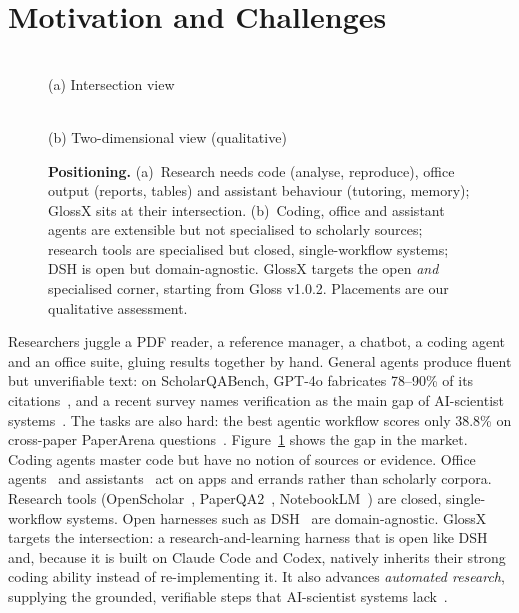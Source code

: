 \documentclass{article}
\newcommand{\sysname}{GlossX}
\begin{document}
\section{Motivation and Challenges}
\label{sec:motivation}

\begin{figure}[t]
  \centering
  \begin{minipage}[b]{0.44\textwidth}
    \centering
    \resizebox{\linewidth}{!}{}\\[-2pt]
    {\small (a) Intersection view}
  \end{minipage}\hfill
  \begin{minipage}[b]{0.53\textwidth}
    \centering
    \resizebox{\linewidth}{!}{}\\[-2pt]
    {\small (b) Two-dimensional view (qualitative)}
  \end{minipage}
  \caption{\textbf{Positioning.} (a)~Research needs code (analyse, reproduce), office output (reports, tables) and assistant behaviour (tutoring, memory); \sysname{} sits at their intersection. (b)~Coding, office and assistant agents are extensible but not specialised to scholarly sources; research tools are specialised but closed, single-workflow systems; DSH is open but domain-agnostic. \sysname{} targets the open \emph{and} specialised corner, starting from Gloss v1.0.2. Placements are our qualitative assessment.}
  \label{fig:positioning}
  \vspace{-8pt}
\end{figure}

Researchers juggle a PDF reader, a reference manager, a chatbot, a coding agent and an office suite, gluing results together by hand. General agents produce fluent but unverifiable text: on ScholarQABench, GPT-4o fabricates 78--90\% of its citations~\cite{asai2024openscholar}, and a recent survey names verification as the main gap of AI-scientist systems~\cite{ding2026verification}. The tasks are also hard: the best agentic workflow scores only 38.8\% on cross-paper PaperArena questions~\cite{wang2025paperarena}. Figure~\ref{fig:positioning} shows the gap in the market. Coding agents master code but have no notion of sources or evidence. Office agents~\cite{workbuddy2026} and assistants~\cite{muse2026,dots2026} act on apps and errands rather than scholarly corpora. Research tools (OpenScholar~\cite{asai2024openscholar}, PaperQA2~\cite{skarlinski2024paperqa2}, NotebookLM~\cite{notebooklm}) are closed, single-workflow systems. Open harnesses such as DSH~\cite{dsh2026} are domain-agnostic. \sysname{} targets the intersection: a research-and-learning harness that is open like DSH and, because it is built on Claude Code and Codex, natively inherits their strong coding ability instead of re-implementing it. It also advances \emph{automated research}, supplying the grounded, verifiable steps that AI-scientist systems lack~\cite{ding2026verification}.
\end{document}
